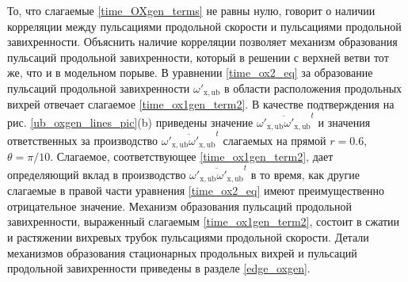То, что слагаемые \eqref{time_OXgen_terms} не равны нулю, говорит о наличии корреляции между пульсациями продольной скорости и пульсациями продольной завихренности. Объяснить наличие корреляции позволяет механизм образования пульсаций продольной завихренности, который в решении с верхней ветви тот же, что и в модельном порыве. В уравнении \eqref{time_ox2_eq} за образование пульсаций продольной завихренности $\omega'_\mathrm{x,ub}$ в области расположения продольных вихрей отвечает слагаемое \eqref{time_ox1gen_term2}. В качестве подтверждения на рис. \ref{ub_oxgen_lines_pic}(b) приведены значение $\overline{\omega'_\mathrm{x,ub}\omega'_\mathrm{x,ub}}^t$ и значения ответственных за производство $\overline{\omega'_\mathrm{x,ub}\omega'_\mathrm{x,ub}}^t$ слагаемых на прямой $r = 0.6$, $\theta = \pi/10$. Слагаемое, соответствующее \eqref{time_ox1gen_term2}, дает определяющий вклад в производство  $\overline{\omega'_\mathrm{x,ub}\omega'_\mathrm{x,ub}}^t$ в то время, как другие слагаемые в правой части уравнения \eqref{time_ox2_eq} имеют преимущественно отрицательное значение. Механизм образования пульсаций продольной завихренности, выраженный слагаемым \eqref{time_ox1gen_term2}, состоит в сжатии и растяжении вихревых трубок пульсациями продольной скорости. Детали механизмов образования стационарных продольных вихрей и пульсаций продольной завихренности приведены в разделе \ref{edge_oxgen}.

